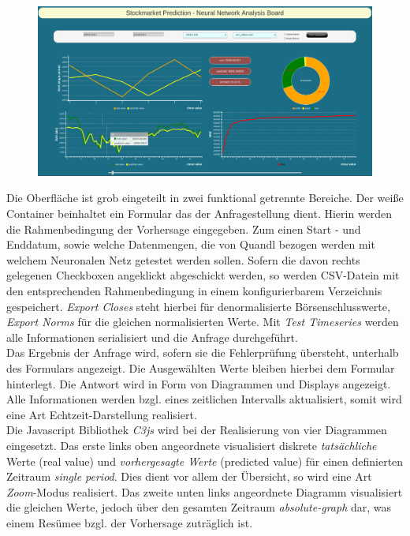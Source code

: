 \begin{figure}
\includegraphics[width=15cm]{Bilder/Umsetzung/Mokup_GUI.png}
\end{figure}
Die Oberfläche ist grob eingeteilt in zwei funktional getrennte Bereiche. Der weiße Container beinhaltet ein Formular das der Anfragestellung dient. Hierin werden die Rahmenbedingung der Vorhersage eingegeben. Zum einen Start - und Enddatum, sowie welche Datenmengen, die von Quandl bezogen werden mit welchem Neuronalen Netz getestet werden sollen. Sofern die davon rechts gelegenen Checkboxen angeklickt abgeschickt werden, so werden CSV-Datein mit den entsprechenden Rahmenbedingung in einem konfigurierbarem Verzeichnis gespeichert. \emph{Export Closes} steht hierbei für denormalisierte Börsenschlusswerte, \emph{Export Norms} für die gleichen normalisierten Werte. Mit \emph{Test Timeseries} werden alle Informationen serialisiert und die Anfrage durchgeführt.\\
Das Ergebnis der Anfrage wird, sofern sie die Fehlerprüfung übersteht, unterhalb des Formulars angezeigt. Die Ausgewählten Werte bleiben hierbei dem Formular hinterlegt.
Die Antwort wird in Form von Diagrammen und Displays angezeigt. Alle Informationen werden bzgl. eines zeitlichen Intervalls aktualisiert, somit wird eine Art Echtzeit-Darstellung realisiert.\\ 
Die Javascript Bibliothek \emph{C3js} wird bei der Realisierung von vier Diagrammen eingesetzt. Das erste links oben angeordnete visualisiert diskrete \emph{tatsächliche} Werte (real value) und \emph{vorhergesagte Werte} (predicted value) für einen definierten Zeitraum \emph{single period}. Dies dient vor allem der Übersicht, so wird eine Art \emph{Zoom}-Modus realisiert. Das zweite unten links angeordnete Diagramm visualisiert die gleichen Werte, jedoch über den gesamten Zeitraum \emph{absolute-graph} dar, was einem Resümee bzgl. der Vorhersage zuträglich ist.\\
